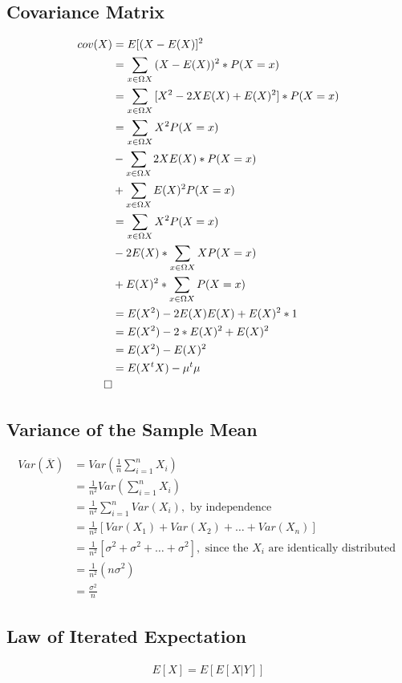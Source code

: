 \documentclass[]{book}
\begin{document}
\subsection{Covariance Matrix}

\begin{align}
cov(X) &= E[(X-E(X)]^2\\
&= \sum_{x\in \Omega X} {(X-E(X))^2*P(X=x)}\\
&= \sum_{x\in \Omega X} {[X^2-2XE(X)+E(X)^2]*P(X=x)}\\
&= \sum_{x\in \Omega X} {X^2P(X=x)} \\&- \sum_{x\in \Omega X} {2XE(X)*P(X=x)} \\&+ \sum_{x \in \Omega X} {E(X)^2P(X=x)}\\
&= \sum_{x\in \Omega X} {X^2P(X=x)} \\&- 2E(X)*\sum_{x\in \Omega X} {XP(X=x)} \\&+ E(X)^2*\sum_{x \in \Omega X} {P(X=x)}\\
&= E(X^2)-2E(X)E(X)+E(X)^2*1\\
&= E(X^2)-2*E(X)^2+E(X)^2\\
&= E(X^2)-E(X)^2\\
&= E(X^tX)-\mu^t\mu\\
\qed
\end{align}

\subsection{Variance of the Sample Mean}

\begin{align}
Var\left({\overline{X}}\right)&=Var\left( \frac{1}{n}\sum_{i=1}^nX_i\right)\\&= \frac{1}{n^2}Var\left( \sum_{i=1}^nX_i\right)\\&=\frac{1}{n^2}\sum_{i=1}^nVar(X_i), \text{ by independence}\\&= \frac{1}{n^2}\left[Var(X_1)+Var(X_2)+\ldots+Var(X_n) \right]\\&=\frac{1}{n^2}\left[\sigma^2+\sigma^2+\ldots+\sigma^2  \right], \text{ since the }X_i \text{ are identically distributed }\\&= \frac{1}{n^2}(n\sigma^2)\\&=\frac{\sigma^2}{n}
\end{align}

\subsection {Law of Iterated Expectation}
\begin{align}
	E[X] = E[ E[X|Y] ]
\end{align}
\end{document}
